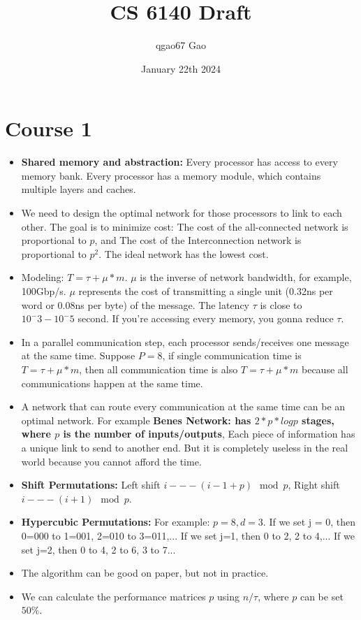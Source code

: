 \documentclass{article}
\title{CS 6140 Draft}
\author{qgao67 Gao}
\date{January 22th 2024}
\begin{document}
\maketitle
\section{Course 1}
\begin{itemize}
    \item \textbf{Shared memory and abstraction: }Every processor has access to every memory bank. Every processor has a memory module, which contains multiple layers and caches.
    \item We need to design the optimal network for those processors to link to each other. The goal is to minimize cost: The cost of the all-connected network is proportional to $p$, and The cost of the Interconnection network is proportional to $p^2$. The ideal network has the lowest cost.
    \item Modeling: $T = \tau + \mu * m$. $\mu$ is the inverse of network bandwidth, for example, 100Gbp/s. $\mu$ represents the cost of transmitting a single unit (0.32ns per word or 0.08ns per byte) of the message. The latency $\tau$ is close to $10^-3-10^-5$ second. If you're accessing every memory, you gonna reduce $\tau$.
    \item In a parallel communication step, each processor sends/receives one message at the same time. Suppose $P = 8$, if single communication time is  $T = \tau + \mu * m$, then all communication time is also  $T = \tau + \mu * m$ because all communications happen at the same time.
    \item A network that can route every communication at the same time can be an optimal network. For example \textbf{Benes Network: has $2*p*logp$ stages, where $p$ is the number of inputs/outputs}, Each piece of information has a unique link to send to another end. But it is completely useless in the real world because you cannot afford the time. 
    \item \textbf{Shift Permutations:} Left shift $i --- (i-1+p) \mod p$, Right shift $i --- (i+1) \mod p$.
    \item \textbf{Hypercubic Permutations:} For example: $p = 8, d = 3$. If we set j = 0, then 0=000 to 1=001, 2=010 to 3=011,... If we set j=1, then 0 to 2, 2 to 4,... If we set j=2, then 0 to 4, 2 to 6, 3 to 7...
    \item The algorithm can be good on paper, but not in practice. 
    \item We can calculate the performance matrices $p$ using $n/\tau$, where $p$ can be set $50\%$.
\end{itemize}
\end{document}
